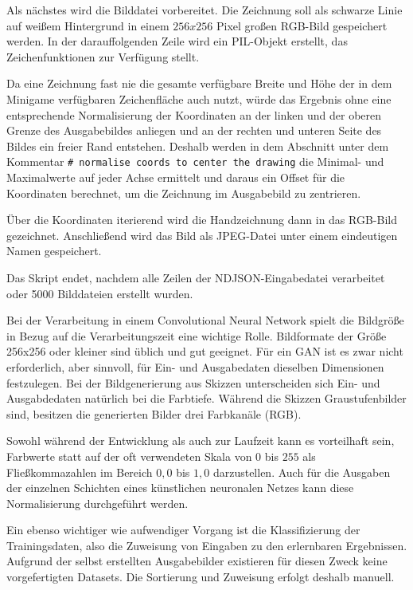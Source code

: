 Als nächstes wird die Bilddatei vorbereitet. Die Zeichnung soll als schwarze Linie auf weißem Hintergrund in einem $256x256$ Pixel großen RGB-Bild gespeichert werden. In der darauffolgenden Zeile wird ein PIL-Objekt erstellt, das Zeichenfunktionen zur Verfügung stellt.

Da eine Zeichnung fast nie die gesamte verfügbare Breite und Höhe der in dem Minigame verfügbaren Zeichenfläche auch nutzt, würde das Ergebnis ohne eine entsprechende Normalisierung der Koordinaten an der linken und der oberen Grenze des Ausgabebildes anliegen und an der rechten und unteren Seite des Bildes ein freier Rand entstehen. Deshalb werden in dem Abschnitt unter dem Kommentar \lstinline{# normalise coords to center the drawing} die Minimal- und Maximalwerte auf jeder Achse ermittelt und daraus ein Offset für die Koordinaten berechnet, um die Zeichnung im Ausgabebild zu zentrieren.

Über die Koordinaten iterierend wird die Handzeichnung dann in das RGB-Bild gezeichnet. Anschließend wird das Bild als JPEG-Datei unter einem eindeutigen Namen gespeichert.

Das Skript endet, nachdem alle Zeilen der NDJSON-Eingabedatei verarbeitet oder 5000 Bilddateien erstellt wurden.

Bei der Verarbeitung in einem Convolutional Neural Network spielt die Bildgröße
in Bezug auf die Verarbeitungszeit eine wichtige Rolle. Bildformate der Größe 256x256 oder kleiner sind üblich und gut geeignet. Für ein GAN ist es zwar nicht erforderlich, aber sinnvoll, für Ein- und Ausgabedaten dieselben Dimensionen festzulegen. Bei der Bildgenerierung aus Skizzen unterscheiden sich Ein- und Ausgabdedaten natürlich bei die Farbtiefe. Während die Skizzen Graustufenbilder sind, besitzen die generierten Bilder drei Farbkanäle (RGB).

Sowohl während der Entwicklung als auch zur Laufzeit kann es vorteilhaft sein, Farbwerte statt auf der oft verwendeten Skala von $0$ bis $255$ als Fließkommazahlen im Bereich $0,0$ bis $1,0$ darzustellen. Auch für die Ausgaben der einzelnen Schichten eines künstlichen neuronalen Netzes kann diese Normalisierung durchgeführt werden.

Ein ebenso wichtiger wie aufwendiger Vorgang ist die Klassifizierung der Trainingsdaten, also die Zuweisung von Eingaben zu den erlernbaren Ergebnissen. Aufgrund der selbst erstellten Ausgabebilder existieren für diesen Zweck keine vorgefertigten Datasets. Die Sortierung und Zuweisung erfolgt deshalb manuell.
\pagebreak

